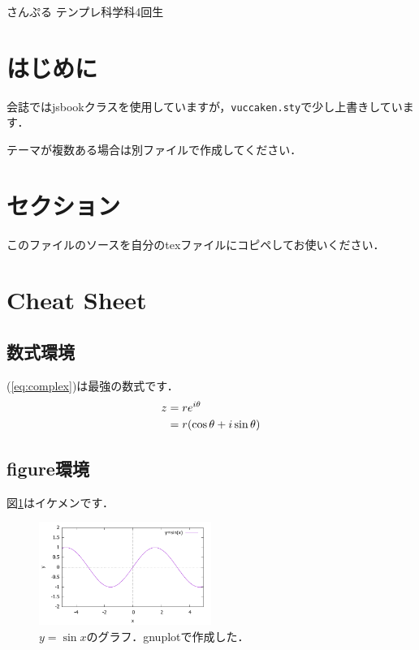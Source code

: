 \documentclass[uplatex,dvipdfmx,10pt,b5paper,papersize]{jsbook}
\begin{document}


\kaishititle%
  {さんぷる}%
  {テンプレ科学科4回生}%
  {}%

\helloLaTeX

%
\section*{はじめに}
会誌ではjsbookクラスを使用していますが，\texttt{vuccaken.sty}で少し上書きしています．\par
テーマが複数ある場合は別ファイルで作成してください．

%
\section{セクション}
このファイルのソースを自分のtexファイルにコピペしてお使いください．

%
\section{Cheat Sheet}

\subsection{数式環境}
(\ref{eq:complex})は最強の数式です．
\begin{align}
  z &= r e^{i\theta} \notag \\
    &= r (\cos\theta + i\sin\theta) \label{eq:complex}
\end{align}

\subsection{figure環境}
図\ref{fig:sin}はイケメンです．
\begin{figure}[htbp]
  \centering
  \includegraphics[width=0.5\textwidth]{img/fig-sin.pdf}
  \caption{$y=\sin x$のグラフ．gnuplotで作成した．}
  \label{fig:sin}
\end{figure}
\end{document}
